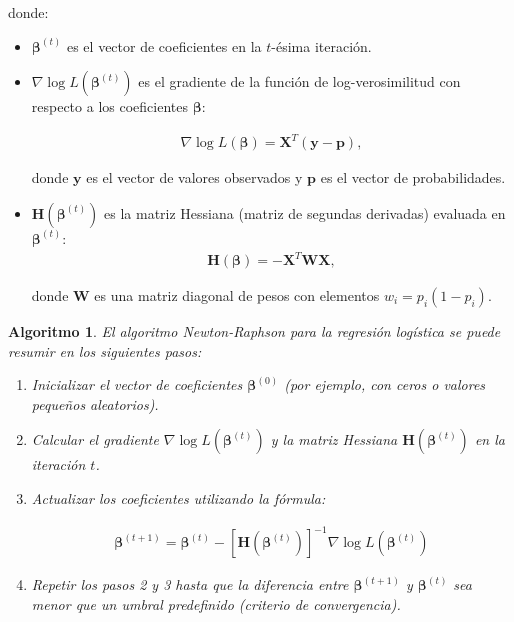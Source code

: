 \documentclass[12pt]{article}
\newtheorem{Algthm}{Algoritmo}
\begin{document}
donde:
\begin{itemize}
\item $\boldsymbol{\beta}^{(t)}$ es el vector de coeficientes en la $t$-ésima iteración.
\item $\nabla \log L(\boldsymbol{\beta}^{(t)})$ es el gradiente de la función de log-verosimilitud con respecto a los coeficientes $\boldsymbol{\beta}$:

\begin{eqnarray}%
\nabla \log L(\boldsymbol{\beta}) = \mathbf{X}^T (\mathbf{y} - \mathbf{p}),
\end{eqnarray}

donde $\mathbf{y}$ es el vector de valores observados y $\mathbf{p}$ es el vector de probabilidades.

\item $\mathbf{H}(\boldsymbol{\beta}^{(t)})$ es la matriz Hessiana (matriz de segundas derivadas) evaluada en $\boldsymbol{\beta}^{(t)}$:
\begin{eqnarray}%
\mathbf{H}(\boldsymbol{\beta}) = -\mathbf{X}^T \mathbf{W} \mathbf{X},
\end{eqnarray}

donde $\mathbf{W}$ es una matriz diagonal de pesos con elementos $w_i = p_i (1 - p_i)$.
\end{itemize}

\begin{Algthm}\label{Algoritmo1}
El algoritmo Newton-Raphson para la regresión logística se puede resumir en los siguientes pasos:
\begin{enumerate}
\item Inicializar el vector de coeficientes $\boldsymbol{\beta}^{(0)}$ (por ejemplo, con ceros o valores pequeños aleatorios).
\item Calcular el gradiente $\nabla \log L(\boldsymbol{\beta}^{(t)})$ y la matriz Hessiana $\mathbf{H}(\boldsymbol{\beta}^{(t)})$ en la iteración $t$.
\item Actualizar los coeficientes utilizando la fórmula:

\begin{eqnarray}%
\boldsymbol{\beta}^{(t+1)} = \boldsymbol{\beta}^{(t)} - \left[ \mathbf{H}(\boldsymbol{\beta}^{(t)}) \right]^{-1} \nabla \log L(\boldsymbol{\beta}^{(t)})
\end{eqnarray}
\item Repetir los pasos 2 y 3 hasta que la diferencia entre $\boldsymbol{\beta}^{(t+1)}$ y $\boldsymbol{\beta}^{(t)}$ sea menor que un umbral predefinido (criterio de convergencia).
\end{enumerate}
\end{Algthm}
\end{document}
